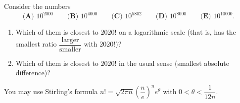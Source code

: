 Consider the numbers
\[\textbf{(A) }10^{2000}\qquad\textbf{(B) }10^{4000}\qquad\textbf{(C) }10^{5802}\qquad\textbf{(D) }10^{8000}\qquad\textbf{(E) }10^{10000}.\]
\begin{enumerate}
\item[(a)] Which of them is closest to $2020!$ on a logarithmic scale (that is, has the smallest ratio $\dfrac{\text{larger}}{\text{smaller}}$ with $2020!$)?
\item[(b)] Which of them is closest to $2020!$ in the usual sense (smallest absolute difference)?
\end{enumerate}
You may use Stirling's formula $n!=\sqrt{2\pi n}\left(\dfrac ne\right)^ne^{\theta}$ with $0<\theta<\dfrac1{12n}$.
